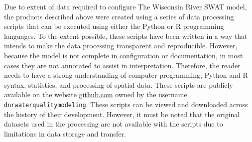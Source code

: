 Due to extent of data required to configure The Wisconsin River SWAT model, the products described above were created using a series of data processing scripts that can be executed using either the Python or R programming languages. To the extent possible, these scripts have been written in a way that intends to make the data processing transparent and reproducible. However, because the model is not complete in configuration or documentation, in most cases they are not annotated to assist in interpretation. Therefore, the reader needs to have a strong understanding of computer programming, Python and R syntax, statistics, and processing of spatial data. These scripts are publicly available on the website \href{http://github.com}{github.com} owned by the username \texttt{dnrwaterqualitymodeling}. These scripts can be viewed and downloaded across the history of their development. However, it must be noted that the original datasets used in the processing are not available with the scripts due to limitations in data storage and transfer. 

\pagebreak